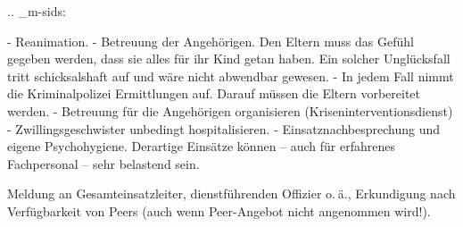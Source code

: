 
.. _m-sids:


\begin{itemize}
	-   Reanimation.
	-   Betreuung der Angehörigen. Den Eltern muss das Gefühl
	gegeben werden, dass sie alles für ihr Kind getan haben. Ein solcher
	Unglücksfall tritt schicksalshaft auf und wäre nicht abwendbar gewesen. 
	-   In jedem Fall nimmt die Kriminalpolizei Ermittlungen auf. Darauf müssen
	die Eltern vorbereitet werden. 
	-   Betreuung für die Angehörigen organisieren
	(Kriseninterventionsdienst)
	-   Zwillingsgeschwister unbedingt hospitalisieren.
	-   Einsatznachbesprechung und eigene Psychohygiene. Derartige Einsätze
	können -- auch für erfahrenes Fachpersonal -- sehr belastend sein. 
	
    Meldung an Gesamteinsatzleiter, dienstführenden
    Offizier o. ä., Erkundigung nach Verfügbarkeit von
    Peers (auch wenn Peer-Angebot nicht angenommen wird!). 
\end{itemize}
